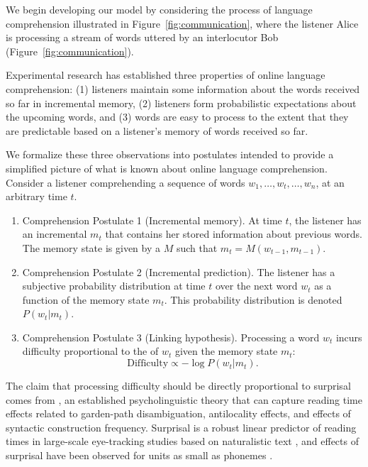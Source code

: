 We begin developing our model by considering the process of language comprehension illustrated in Figure~\ref{fig:communication}, where the listener Alice is processing a stream of words uttered by an interlocutor Bob (Figure~\ref{fig:communication}). 

Experimental research has established three properties of online language comprehension: (1) listeners maintain some information about the words received so far in incremental memory, (2) listeners form probabilistic expectations about the upcoming words, and (3) words are easy to process to the extent that they are predictable based on a listener's memory of words received so far.

We formalize these three observations into postulates intended to provide a simplified picture of what is known about online language comprehension. Consider a listener comprehending a sequence of words $w_1, \dots, w_t, \dots, w_n$, at an arbitrary time $t$.
\begin{enumerate}
    \item Comprehension Postulate 1 (Incremental memory). At time $t$, the listener has an incremental  $m_t$ that contains her stored information about previous words. The memory state is given by a  $M$ such that $m_t = M(w_{t-1}, m_{t-1})$.
    \item Comprehension Postulate 2 (Incremental prediction). The listener has a subjective probability distribution at time $t$ over the next word $w_t$ as a function of the memory state $m_t$. This probability distribution is denoted $P(w_t|m_t)$.
    \item Comprehension Postulate 3 (Linking hypothesis). Processing a word $w_t$ incurs difficulty proportional to the  of $w_t$ given the memory state $m_t$:
    \begin{equation}
    \label{eq:lossy-surp}
    \text{Difficulty} \propto -\log P(w_t | m_t).
\end{equation}
\end{enumerate}
The claim that processing difficulty should be directly proportional to surprisal comes from  \citep{hale2001probabilistic,levy2008expectation}, an established psycholinguistic theory that can capture reading time effects related to garden-path disambiguation, antilocality effects, and effects of syntactic construction frequency. Surprisal is a robust linear predictor of reading times in large-scale eye-tracking studies based on naturalistic text \citep{smith-effect-2013,goodkind-predictive-2018}, and effects of surprisal have been observed for units as small as phonemes \citep{}.

